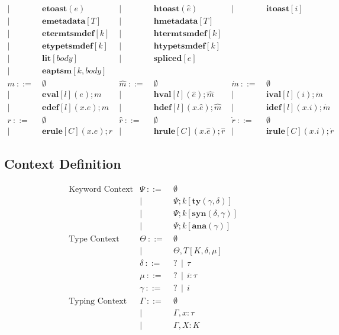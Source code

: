 \documentclass[letterpaper, notitlepage]{article}
\begin{document}
\[\begin{array}{rlrlrl}
				| ~ &~ \mathbf{etoast}(e)     			& 		 	| ~ &~	\mathbf{htoast}(\hat{e})				& 		 	| ~ &~	\mathbf{itoast}[i]\\
				| ~ &~ \mathbf{emetadata}[T]     		& 		 	| ~ &~	\mathbf{hmetadata}[T]\\
				| ~ &~ \mathbf{etermtsmdef}[k]     		&			| ~ &~ 	\mathbf{htermtsmdef}[k]\\
				| ~ &~ \mathbf{etypetsmdef}[k]			& 			| ~ &~ 	\mathbf{htypetsmdef}[k]\\
				| ~ &~ \mathbf{lit}[body]					& 		 	| ~ &~ 	\mathbf{spliced}[e]\\
				| ~ &~ \mathbf{eaptsm}[k,body]\\
	m 			~::=&~ \emptyset						&\hat{m}	~::=&~ \emptyset								&\dot{m}	~::=&~ \emptyset\\
				| ~ &~ \mathbf{eval}[l](e);m 			&			| ~ &~ \mathbf{hval}[l](\hat{e});\hat{m} 		&			| ~ &~ \mathbf{ival}[l](i);\dot{m}\\
				| ~ &~ \mathbf{edef}[l](x.e);m 			&			| ~ &~ \mathbf{hdef}[l](x.\hat{e});\hat{m}		&			| ~ &~ \mathbf{idef}[l](x.i);\dot{m}\\
	r 			~::=&~ \emptyset 						&\hat{r} 	~::=&~ \emptyset 								&\dot{r} 	~::=&~ \emptyset\\
				| ~ &~ \mathbf{erule}[C](x.e);r 		& 			| ~ &~ \mathbf{hrule}[C](x.\hat{e});\hat{r} 	&			| ~ &~ \mathbf{irule}[C](x.i);\dot{r}
\end{array}
\]
\subsection{Context Definition}
\[
\begin{array}{rrl}
\text{Keyword Context}	&	\Psi 	~::=&~ 	\emptyset\\
						&			| ~ &~ 	\Psi;k[\mathbf{ty}(\gamma,\delta)]\\
						&			| ~ &~ 	\Psi;k[\mathbf{syn}(\delta,\gamma)]\\
						&			| ~ &~ 	\Psi;k[\mathbf{ana}(\gamma)]\\
\text{Type Context}		&	\Theta 	~::=&~ \emptyset\\
						&			| ~ &~ \Theta,T[K,\delta,\mu] \\
						&	\delta 	~::=&~ ? ~~ | ~~ \tau\\
						&	\mu	   	~::=&~ ? ~~ | ~~ i:\tau\\
						& 	\gamma  ~::=&~ ? ~~ | ~~ i\\
\text{Typing Context}	&	\Gamma 	~::=&~ \emptyset\\
						&			| ~ &~ \Gamma,x:\tau\\
						& 			| ~ &~ \Gamma,X:K\\
\end{array}
\]
\end{document}
